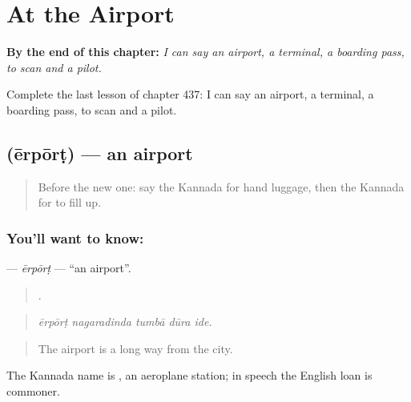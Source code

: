 
\chapter{At the Airport}
\label{ch:ka-at-the-airport}

\begin{chapteropening}
\textbf{By the end of this chapter:} \emph{I can say an airport, a terminal, a boarding pass, to scan and a pilot.}

Complete the last lesson of chapter 437: I can say an airport, a terminal, a boarding pass, to scan and a pilot.
\end{chapteropening}

\section[\texorpdfstring{\kn{ಏರ್ಪೋರ್ಟ್} (ērpōrṭ)}{ಏರ್ಪೋರ್ಟ್ (ērpōrṭ)}]{ (ērpōrṭ) — an airport}

\label{lesson:KA-C437-erport}



\begin{quote}
Before the new one: say the Kannada for hand luggage, then the Kannada for to fill up.
\end{quote}

\subsection*{You'll want to know: }
\textbf{} — \emph{ērpōrṭ} — \textquotedblleft{}an airport\textquotedblright{}.

\begin{quote}
    .
\end{quote}

\begin{quote}
\emph{ērpōrṭ nagaradinda tumbā dūra ide.}
\end{quote}

\begin{quote}
The airport is a long way from the city.
\end{quote}

The Kannada name is  , an aeroplane station; in speech the English loan is commoner.

